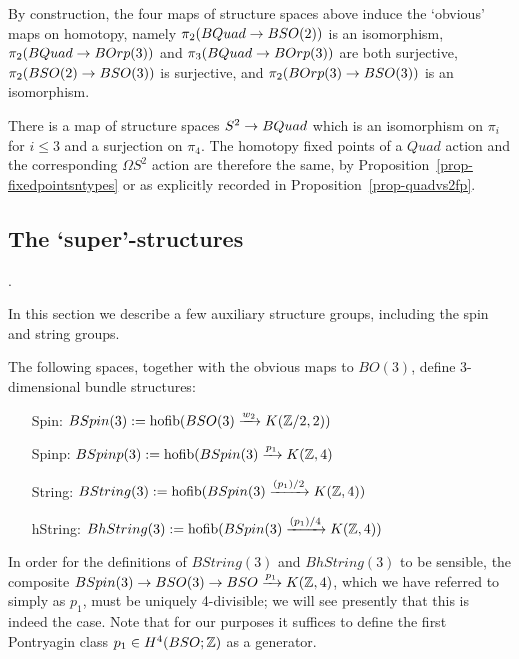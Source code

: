 \documentclass{amsart}
\begin{document}
By construction, the four maps of structure spaces above induce the `obvious' maps on homotopy, namely $\pi_2(BQuad \rightarrow BSO(2))$ is an isomorphism, $\pi_2(BQuad \rightarrow BOrp(3))$ and $\pi_3(BQuad \rightarrow BOrp(3))$ are both surjective, $\pi_2(BSO(2) \rightarrow BSO(3))$ is surjective, and $\pi_2(BOrp(3) \rightarrow BSO(3))$ is an isomorphism.  

\begin{remark}
There is a map of structure spaces $S^2 \rightarrow BQuad$ which is an isomorphism on $\pi_i$ for $i \leq 3$ and a surjection on $\pi_4$.  The homotopy fixed points of a $Quad$ action and the corresponding $\Omega S^2$ action are therefore the same, by Proposition~\ref{prop-fixedpointsntypes} or as explicitly recorded in Proposition~\ref{prop-quadvs2fp}.
\end{remark}

\subsection{The `super'-structures}.


In this section we describe a few auxiliary structure groups, including the spin and string groups.

\begin{definition}
The following spaces, together with the obvious maps to $BO(3)$, define 3-dimensional bundle structures:
\begin{itemize}
\item[Spin:] $BSpin(3) := \operatorname{hofib}(BSO(3) \xrightarrow{w_2} K(\mathbb Z/2,2))$
\item[Spinp:] $BSpinp(3) := \operatorname{hofib}(BSpin(3) \xrightarrow{p_1} K(\mathbb Z,4)$
\item[String:] $BString(3) := \operatorname{hofib}(BSpin(3) \xrightarrow{(p_1)/2} K(\mathbb Z,4))$
\item[hString:] $BhString(3) := \operatorname{hofib}(BSpin(3) \xrightarrow{(p_1)/4} K(\mathbb Z,4))$
\end{itemize}
\end{definition}

\nid In order for the definitions of $BString(3)$ and $BhString(3)$ to be sensible, the composite $BSpin(3) \rightarrow BSO(3) \rightarrow BSO \xrightarrow{p_1} K(\mathbb Z,4)$, which we have referred to simply as $p_1$, must be uniquely 4-divisible; we will see presently that this is indeed the case.  Note that for our purposes it suffices to define the first Pontryagin class $p_1 \in H^4(BSO;\mathbb Z)$ as a generator.
\end{document}
